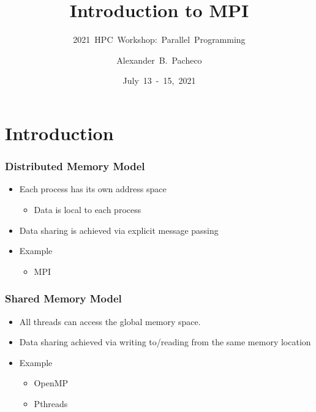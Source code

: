 \documentclass[10pt,t]{beamer}
\title[MPI]{Introduction to MPI}
\subtitle{2021~HPC~Workshop:~Parallel~Programming}
\author{\large{Alexander~B.~Pacheco}}
\institute[Lehigh University Research Computing]{\href{http://researchcomputing.lehigh.edu}{Research~Computing}}
\date{July~13~-~15,~2021}
\begin{document}
\begin{frame}
  \titlepage
\end{frame}

\scriptsize
\section{Introduction}
\begin{frame}
  \frametitle{Distributed Memory Model}
    \begin{itemize}
      \item Each process has its own address space
      \begin{itemize}
        \item Data is local to each process
      \end{itemize}
      \item Data sharing is achieved via explicit message passing
      \item Example
      \begin{itemize}
        \item MPI
      \end{itemize}
    \end{itemize}

    
\end{frame}

\begin{frame}
  \frametitle{Shared Memory Model}
    \begin{itemize}
      \item All threads can access the global memory space.
      \item Data sharing achieved via writing to/reading from the same memory location
      \item Example
      \begin{itemize}
        \item OpenMP
        \item Pthreads
      \end{itemize}
    \end{itemize}
    
\end{frame}
\end{document}
